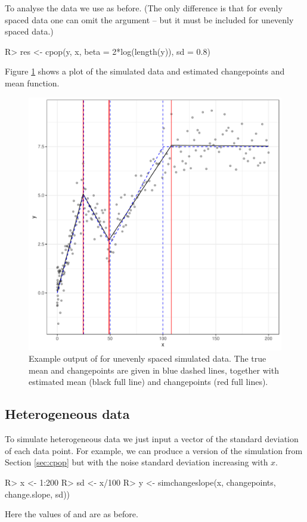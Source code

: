 \documentclass[article]{jss}
\begin{document}
To analyse the data we use  as before. (The only difference is that for evenly spaced data one can omit the  argument -- but it must be included for unevenly spaced data.)
\begin{CodeChunk}
\begin{CodeInput}
R> res <- cpop(y, x, beta = 2*log(length(y)), sd = 0.8)
\end{CodeInput}
\end{CodeChunk}
%
%
Figure \ref{fig:cpop-example-uneven} shows a plot of the simulated data and estimated changepoints and mean function.

\begin{figure}
\centering
\includegraphics[width=0.6\linewidth]{figures/cpop_example_uneven_ggplot.pdf}
\caption{Example output of  for unevenly spaced simulated data. The true mean and changepoints are given in blue dashed lines, together with estimated mean (black full line) and changepoints (red full lines). }
\label{fig:cpop-example-uneven}
\end{figure}
%
%
\subsection{Heterogeneous data}

To simulate heterogeneous data we just input a vector of the standard deviation of each data point. For example, we can produce a version of the simulation from Section \ref{sec:cpop} but with the noise standard deviation increasing with $x$.

\begin{CodeChunk}
\begin{CodeInput}
R> x <- 1:200
R> sd <- x/100
R> y <- simchangeslope(x, changepoints, change.slope, sd))
\end{CodeInput}
\end{CodeChunk}
%
%
Here the values of  and  are as before.
\end{document}
